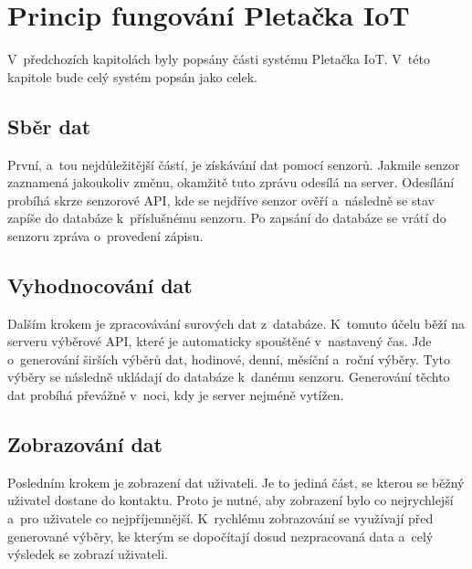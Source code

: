 \chapter{Princip fungování Pletačka IoT}
V~předchozích kapitolách byly popsány části systému Pletačka IoT.
V~této kapitole bude celý systém popsán jako celek.


\section{Sběr dat}
První, a~tou nejdůležitější částí, je získávání dat pomocí senzorů.
Jakmile senzor zaznamená jakoukoliv změnu, okamžitě tuto zprávu odesílá na server.
Odesílání probíhá skrze senzorové API, kde se nejdříve senzor ověří a~následně se stav zapíše do databáze k~příslušnému senzoru.
Po zapsání do databáze se vrátí do senzoru zpráva o~provedení zápisu. 


\section{Vyhodnocování dat}
Dalším krokem je zpracovávání surových dat z~databáze.
K~tomuto účelu běží na serveru výběrové API, které je automaticky spouštěné v~nastavený čas.
Jde o~generování širších výběrů dat, hodinové, denní, měsíční a~roční výběry.
Tyto výběry se následně ukládají do databáze k~danému senzoru.
Generování těchto dat probíhá převážně v~noci, kdy je server nejméně vytížen.


\section{Zobrazování dat}
Posledním krokem je zobrazení dat uživateli.
Je to jediná část, se kterou se běžný uživatel dostane do kontaktu.
Proto je nutné, aby zobrazení bylo co nejrychlejší a~pro uživatele co nejpříjemnější.
K~rychlému zobrazování se využívají před generované výběry, ke kterým se dopočítají dosud nezpracovaná data a~celý výsledek se zobrazí uživateli.





